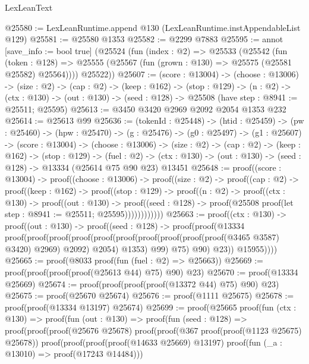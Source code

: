 \begin{lexlean}{LexLeanText}
\begin{coremodule}
@25580 := LexLeanRuntime.append @130 (LexLeanRuntime.instAppendableList @129)
@25581 := @25580 @1353
@25582 := @2299 @7883
@25595 := annot [save_info := bool true]
  (@25524
    (fun (index : @2) =>
    @25533
      (@25542
        (fun (token : @128) =>
        @25555 (@25567 (fun (grown : @130) => @25575 (@25581 @25582) @25564))))
      @25522))
@25607 := (score : @13004) ->
  (choose : @13006) ->
  (size : @2) ->
  (cap : @2) ->
  (keep : @162) ->
  (stop : @129) ->
  (n : @2) ->
  (ctx : @130) -> (out : @130) -> (seed : @128) -> @25508 (have step : @8941 := @25511; @25595)
@25613 := @3450 @3420 @2969 @2092 @2054 @1353 @232
@25614 := @25613 @99
@25636 := (tokenId : @25448) ->
  (htid : @25459) ->
  (pw : @25460) ->
  (hpw : @25470) ->
  (g : @25476) ->
  (g0 : @25497) ->
  (g1 : @25607) ->
  (score : @13004) ->
  (choose : @13006) ->
  (size : @2) ->
  (cap : @2) ->
  (keep : @162) ->
  (stop : @129) ->
  (fuel : @2) -> (ctx : @130) -> (out : @130) -> (seed : @128) -> @13334 (@25614 @75 @90 @23) @13451
@25648 := proof((score : @13004) ->
    proof((choose : @13006) ->
      proof((size : @2) ->
        proof((cap : @2) ->
          proof((keep : @162) ->
            proof((stop : @129) ->
              proof((n : @2) ->
                proof((ctx : @130) ->
                  proof((out : @130) ->
                    proof((seed : @128) ->
                      proof(@25508 proof(let step : @8941 := @25511; @25595))))))))))))
@25663 := proof((ctx : @130) ->
    proof((out : @130) ->
      proof((seed : @128) ->
        proof(proof(@13334
              proof(proof(proof(proof(proof(proof(proof(proof(proof(proof(@3465 @3587) @3420) @2969)
                              @2092)
                            @2054)
                          @1353)
                        @99)
                      @75)
                    @90)
                  @23))
            @15955))))
@25665 := proof(@8033 proof(fun (fuel : @2) => @25663))
@25669 := proof(proof(proof(proof(@25613 @44) @75) @90) @23)
@25670 := proof(@13334 @25669)
@25674 := proof(proof(proof(proof(@13372 @44) @75) @90) @23)
@25675 := proof(@25670 @25674)
@25676 := proof(@1111 @25675)
@25678 := proof(proof(@13334 @13197) @25674)
@25699 := proof(@25665
      proof(fun (ctx : @130) =>
        proof(fun (out : @130) =>
          proof(fun (seed : @128) =>
            proof(proof(proof(@25676 @25678)
                  proof(proof(@367 proof(proof(@1123 @25675) @25678))
                      proof(proof(proof(proof(@14633 @25669) @13197)
                            proof(fun (_a : @13010) => proof(@17243 @14484)))

\end{coremodule}
\end{lexlean}

